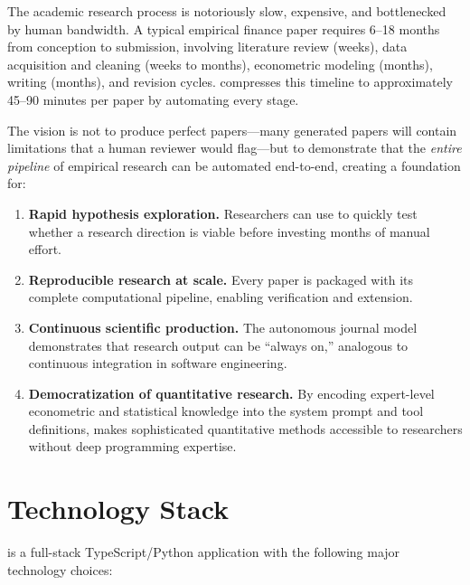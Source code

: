 The academic research process is notoriously slow, expensive, and bottlenecked by human bandwidth.
A typical empirical finance paper requires 6--18 months from conception to submission, involving literature review (weeks), data acquisition and cleaning (weeks to months), econometric modeling (months), writing (months), and revision cycles.
\autoscholar compresses this timeline to approximately 45--90 minutes per paper by automating every stage.

The vision is not to produce perfect papers---many generated papers will contain limitations that a human reviewer would flag---but to demonstrate that the \emph{entire pipeline} of empirical research can be automated end-to-end, creating a foundation for:

\begin{enumerate}[label=(\roman*)]
  \item \textbf{Rapid hypothesis exploration.} Researchers can use \autoscholar to quickly test whether a research direction is viable before investing months of manual effort.
  \item \textbf{Reproducible research at scale.} Every paper is packaged with its complete computational pipeline, enabling verification and extension.
  \item \textbf{Continuous scientific production.} The autonomous journal model demonstrates that research output can be ``always on,'' analogous to continuous integration in software engineering.
  \item \textbf{Democratization of quantitative research.} By encoding expert-level econometric and statistical knowledge into the system prompt and tool definitions, \autoscholar makes sophisticated quantitative methods accessible to researchers without deep programming expertise.
\end{enumerate}

\section{Technology Stack}
\label{sec:overview:stack}

\autoscholar is a full-stack TypeScript/Python application with the following major technology choices:

